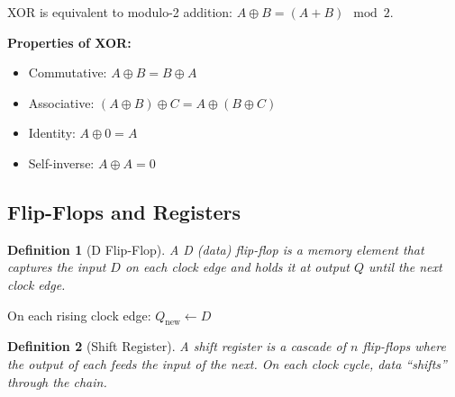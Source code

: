 \documentclass[11pt]{article}
\newtheorem{definition}{Definition}
\begin{document}
XOR is equivalent to modulo-2 addition: $A \oplus B = (A + B) \mod 2$.

\textbf{Properties of XOR:}
\begin{itemize}
    \item Commutative: $A \oplus B = B \oplus A$
    \item Associative: $(A \oplus B) \oplus C = A \oplus (B \oplus C)$
    \item Identity: $A \oplus 0 = A$
    \item Self-inverse: $A \oplus A = 0$
\end{itemize}

\subsection{Flip-Flops and Registers}

\begin{definition}[D Flip-Flop]
A D (data) flip-flop is a memory element that captures the input $D$ on each clock edge and holds it at output $Q$ until the next clock edge.
\end{definition}

\begin{center}
\end{center}

On each rising clock edge: $Q_{\text{new}} \leftarrow D$

\begin{definition}[Shift Register]
A shift register is a cascade of $n$ flip-flops where the output of each feeds the input of the next. On each clock cycle, data ``shifts'' through the chain.
\end{definition}

\begin{center}
\end{center}
\end{document}
